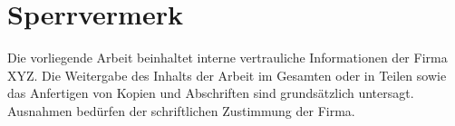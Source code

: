 \chapter*{Sperrvermerk}
\label{confidentiality}

Die vorliegende Arbeit beinhaltet interne vertrauliche Informationen der Firma XYZ. Die Weitergabe des Inhalts der Arbeit im Gesamten oder in Teilen sowie das Anfertigen von Kopien und Abschriften sind grundsätzlich untersagt. Ausnahmen bedürfen der schriftlichen Zustimmung der Firma.
